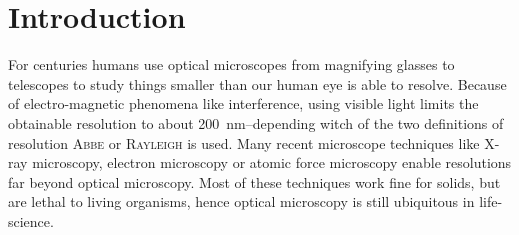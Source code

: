\documentclass[11pt, a4paper, oneside, twocolumn]{report}
\newcommand{\x}[1]{#1\index{#1}}
\begin{document}
% 
% 
\clearpage \tableofcontents
\clearpage\chapter{Introduction}

For centuries humans use optical microscopes from magnifying glasses
to telescopes to study things smaller than our human eye is able to
resolve. Because of electro-magnetic phenomena like interference,
using visible light limits the obtainable resolution to
about \SI{200}{nm}--depending witch of the two definitions of
\x{resolution} \textsc{Abbe} or \textsc{Rayleigh} is used. Many recent
microscope techniques like X-ray microscopy, electron microscopy or
atomic force microscopy enable resolutions far beyond optical
microscopy. Most of these techniques work fine for solids, but are
lethal to living organisms, hence optical microscopy is still
ubiquitous in life-science.\\
\end{document}
